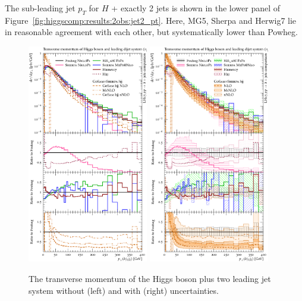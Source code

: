 The sub-leading jet $p_T$ for $H$ + exactly 2 jets is shown in the
lower panel of Figure~\ref{fig:higgscomp:results:2obs:jet2_pt}.
Here, MG5, Sherpa and Herwig7 lie in reasonable agreement with each
other, but systematically lower than Powheg.


\begin{figure}[t!]
  \centering
  \includegraphics[width=0.47\textwidth]{figures/hjetscomp_u_Hjj_pT_incl.pdf}
  \hfill
  \includegraphics[width=0.47\textwidth]{figures/hjetscomp_Hjj_pT_incl.pdf}
  \caption{
    The transverse momentum of the Higgs boson plus two leading jet
    system without (left) and with (right) uncertainties.
    \label{fig:higgscomp:results:2obs:hjj_pt}
  }
\end{figure}

